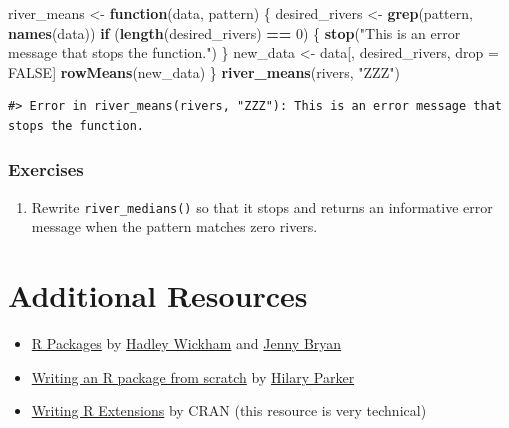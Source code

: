 \documentclass[
]{book}
\newenvironment{Shaded}{\begin{snugshade}}{\end{snugshade}}
\newcommand{\ControlFlowTok}[1]{\textcolor[rgb]{0.13,0.29,0.53}{\textbf{#1}}}
\newcommand{\DecValTok}[1]{\textcolor[rgb]{0.00,0.00,0.81}{#1}}
\newcommand{\KeywordTok}[1]{\textcolor[rgb]{0.13,0.29,0.53}{\textbf{#1}}}
\newcommand{\NormalTok}[1]{#1}
\newcommand{\OperatorTok}[1]{\textcolor[rgb]{0.81,0.36,0.00}{\textbf{#1}}}
\newcommand{\OtherTok}[1]{\textcolor[rgb]{0.56,0.35,0.01}{#1}}
\newcommand{\StringTok}[1]{\textcolor[rgb]{0.31,0.60,0.02}{#1}}
\providecommand{\tightlist}{%
  \setlength{\itemsep}{0pt}\setlength{\parskip}{0pt}}
\begin{document}
\begin{Shaded}
\begin{Highlighting}[]
\NormalTok{river_means <-}\StringTok{ }\ControlFlowTok{function}\NormalTok{(data, pattern) \{}
\NormalTok{  desired_rivers <-}\StringTok{ }\KeywordTok{grep}\NormalTok{(pattern, }\KeywordTok{names}\NormalTok{(data))}
  \ControlFlowTok{if}\NormalTok{ (}\KeywordTok{length}\NormalTok{(desired_rivers) }\OperatorTok{==}\StringTok{ }\DecValTok{0}\NormalTok{) \{}
    \KeywordTok{stop}\NormalTok{(}\StringTok{"This is an error message that stops the function."}\NormalTok{)}
\NormalTok{  \}}
\NormalTok{  new_data <-}\StringTok{ }\NormalTok{data[, desired_rivers, drop =}\StringTok{ }\OtherTok{FALSE}\NormalTok{]}
  \KeywordTok{rowMeans}\NormalTok{(new_data)}
\NormalTok{\}}
\KeywordTok{river_means}\NormalTok{(rivers, }\StringTok{"ZZZ"}\NormalTok{)}
\end{Highlighting}
\end{Shaded}

\begin{verbatim}
#> Error in river_means(rivers, "ZZZ"): This is an error message that stops the function.
\end{verbatim}

\hypertarget{ex-set6}{%
\subsubsection{Exercises}\label{ex-set6}}

\begin{enumerate}
\def\labelenumi{\arabic{enumi}.}
\tightlist
\item
  Rewrite \texttt{river\_medians()} so that it stops and returns an informative error message when the pattern matches zero rivers.
\end{enumerate}

\hypertarget{add-resources}{%
\section{Additional Resources}\label{add-resources}}

\begin{itemize}
\tightlist
\item
  \href{https://r-pkgs.org/index.html}{R Packages} by \href{http://hadley.nz/}{Hadley Wickham} and \href{https://jennybryan.org/}{Jenny Bryan} \citep{wickham2015r}
\item
  \href{https://hilaryparker.com/2014/04/29/writing-an-r-package-from-scratch/}{Writing an R package from scratch} by \href{https://hilaryparker.com/}{Hilary Parker}
\item
  \href{https://cran.r-project.org/doc/manuals/r-release/R-exts.html}{Writing R Extensions} by CRAN (this resource is very technical)
\end{itemize}
\end{document}
